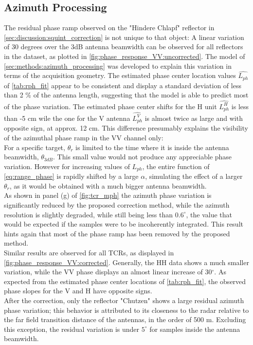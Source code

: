 \subsection{Azimuth Processing}\label{sec:discussion:azimuth_processing}
The residual phase ramp observed on the "Hindere Chlapf" reflector in \autoref{sec:discussion:squint_correction} is not unique to that object: A linear variation of 30 degrees over the 3dB antenna beamwidth can be observed for all reflectors in the dataset, as plotted in \autoref{fig:phase_response_VV:uncorrected}.  The model of \autoref{sec:methods:azimuth_processing} was developed to explain this variation in terms of the acquisition geometry.
The estimated phase center location values $\hat{L_{ph}}$ of \autoref{tab:rph_fit} appear to be consistent and display a standard deviation of less than 2 \% of the antenna length, suggesting that the model is able to predict most of the phase variation. The estimated phase center shifts for the H unit $\hat{L_{ph}^{H}}$ is less than -5 cm wile the one for the V antenna $\hat{L_{ph}^{V}}$ is almost twice as large and with opposite sign, at approx. 12 cm. This difference presumably explains the visibility of the azimuthal phase ramp in the VV channel only:\\
For a specific target,  $\theta_r$ is limited to the time where it is inside the antenna beamwidth, $\theta_{3dB}$. This small value would not produce any appreciable phase variation. However for increasing values of $L_{ph}$, the entire function of \autoref{eq:range_phase} is rapidly shifted  by a large $\alpha$, simulating the effect of a larger $\theta_r$, as it would be obtained with a much bigger antenna beamwidth.\\
As shown in panel (g) of \autoref{fig:tcr_mph} the azimuth phase variation is significantly reduced by the proposed correction method, while the azimuth resolution is slightly degraded, while still being less than $0.6^\circ$, the value that would be expected if the samples were to be incoherently integrated. This result hints again that most of the phase ramp has been removed by the proposed method.\\
Similar results are observed for all TCRs, as displayed in \autoref{fig:phase_response_VV:corrected}.  Generally, the HH data shows a much smaller variation, while the VV phase displays an almost linear increase of 30$^\circ$. As expected from the estimated phase center locations of \autoref{tab:rph_fit}, the observed phase slopes for the V and H have opposite signs.\\  After the correction, only the reflector "Chutzen" shows a large residual azimuth phase variation; this behavior is attributed to its closeness to the radar relative to the far field transition distance of the antennas, in the order of 500 m. Excluding this exception, the residual variation is under $5^\circ$ for samples inside the antenna beamwidth.
